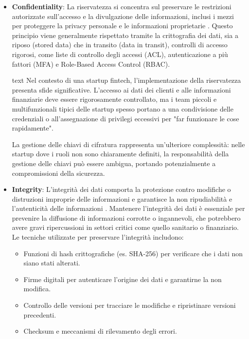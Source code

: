 \begin{itemize}
\item \textbf{Confidentiality}: La riservatezza si concentra sul preservare le restrizioni autorizzate sull'accesso e la divulgazione delle informazioni, inclusi i mezzi per proteggere la privacy personale e le informazioni proprietarie \cite{NIST_SP_1800_26}. Questo principio viene generalmente rispettato tramite la crittografia dei dati, sia a riposo (stored data) che in transito (data in transit), controlli di accesso rigorosi, come liste di controllo degli accessi (ACL), autenticazione a più fattori (MFA) e Role-Based Access Control (RBAC).

text
Nel contesto di una startup fintech, l'implementazione della riservatezza presenta sfide significative. L'accesso ai dati dei clienti e alle informazioni finanziarie deve essere rigorosamente controllato, ma i team piccoli e multifunzionali tipici delle startup spesso portano a una condivisione delle credenziali o all'assegnazione di privilegi eccessivi per "far funzionare le cose rapidamente".

La gestione delle chiavi di cifratura rappresenta un'ulteriore complessità: nelle startup dove i ruoli non sono chiaramente definiti, la responsabilità della gestione delle chiavi può essere ambigua, portando potenzialmente a compromissioni della sicurezza.

\item \textbf{Integrity}: L'integrità dei dati comporta la protezione contro modifiche o distruzioni improprie delle informazioni e garantisce la non ripudiabilità e l'autenticità delle informazioni \cite{NIST_SP_1800_26}. Mantenere l'integrità dei dati è essenziale per prevenire la diffusione di informazioni corrotte o ingannevoli, che potrebbero avere gravi ripercussioni in settori critici come quello sanitario o finanziario. Le tecniche utilizzate per preservare l'integrità includono:
\begin{itemize}
    \item Funzioni di hash crittografiche (es. SHA-256) per verificare che i dati non siano stati alterati.
    \item Firme digitali per autenticare l'origine dei dati e garantirne la non modifica.
    \item Controllo delle versioni per tracciare le modifiche e ripristinare versioni precedenti.
    \item Checksum e meccanismi di rilevamento degli errori.
\end{itemize}


\end{itemize}
